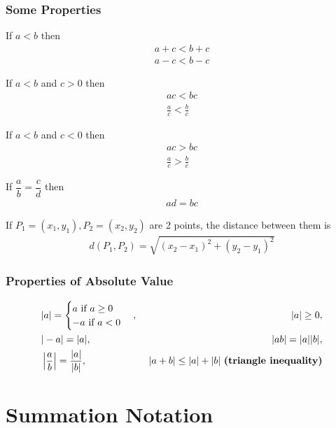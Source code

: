 \documentclass[10pt,a4paper]{book}
\theoremstyle{definition}\newtheorem{definition}{Definition}
\theoremstyle{definition}\newtheorem{fact}{Fact}
\theoremstyle{definition}\newtheorem{ex}{Ex.}
\theoremstyle{definition}\newtheorem{project}{Project}
\theoremstyle{definition}\newtheorem{problem}{Problem}
\theoremstyle{definition}\newtheorem{example}{Example}
\numberwithin{theorem}{chapter}
\numberwithin{corollary}{chapter}
\numberwithin{assumption}{chapter}
\numberwithin{definition}{chapter}
\numberwithin{prop}{chapter}
\numberwithin{notation}{chapter}
\numberwithin{problem}{chapter}
\numberwithin{example}{chapter}
\numberwithin{fact}{chapter}
\numberwithin{ex}{chapter}
\begin{document}
	\subsubsection{Some Properties}
	If $a < b$ then
	\begin{align*}
		a + c < b + c \\
		a - c < b - c 
	\end{align*}
	
	If $a<b$ and $c>0$ then
	\begin{align*}
		ac < bc                   \\
		\frac{a}{c} < \frac{b}{c} 
	\end{align*}
	
	If $a<b$ and $c<0$ then
	\begin{align*}
		ac > bc                   \\
		\frac{a}{c} > \frac{b}{c} 
	\end{align*}
	
	If $\dfrac{a}{b} = \dfrac{c}{d}$ then
	\begin{align*}
		ad = bc 
	\end{align*}
	
	If $P_1 =(x_1, y_1), P_2 =(x_2, y_2)$ are 2 points, the distance between them is
	\begin{align*}
		d(P_1, P_2) = \sqrt{(x_2 - x_1)^2 + (y_2 - y_1)^2} 
	\end{align*}
	
	\subsubsection{Properties of Absolute Value}
	\begin{align*}
		& |a| =                                                 
		\begin{cases}
			a \ \text{if $a \geq 0$} \\
			-a \ \text{if $ a < 0$}
		\end{cases}, \
		& |a| \geq 0,                                           \\
		& |-a| = |a|, \                                         
		& |ab| = |a| |b|,                                       \\
		& \left|\frac{a}{b}\right| = \frac{|a|}{|b|}, \         
		& |a+b| \leq |a| + |b| \ \textbf{(triangle inequality)} 
	\end{align*}
	
	\section{Summation Notation}
\end{document}
